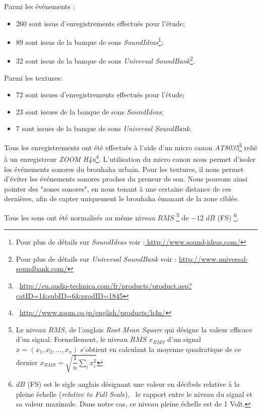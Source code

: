 Parmi les événements :

\begin{itemize}
\item 260 sont issus d’enregistrements effectués pour l'étude;
\item 89 sont issus de la banque de sons \emph{SoundIdeas}\footnote{Pour plus de détails sur \emph{SoundIdeas} voir :\url{ http://www.sound-ideas.com/}};
\item 32 sont issus de la banque de sons \emph{Universal SoundBank}\footnote{Pour plus de détails sur \emph{Universal SoundBank} voir : \url{http://www.universal-soundbank.com/}}.
\end{itemize}

Parmi les textures:

\begin{itemize}
\item 72 sont issues d’enregistrements effectués pour l'étude;
\item 23 sont issues de la banque de sons \emph{SoundIdeas};
\item 7 sont issues de la banque de sons \emph{Universal SoundBank}.
\end{itemize}

Tous les enregistrements ont été effectués à l’aide d'un micro canon \emph{AT8035}\footnote{\cf~\url{http://eu.audio-technica.com/fr/products/product.asp?catID=1&subID=6&prodID=1845}} relié à un enregistreur \emph{ZOOM H4n}\footnote{\cf~\url{http://www.zoom.co.jp/english/products/h4n/}}. L’utilisation du micro canon nous permet d’isoler les événements sonores du brouhaha urbain. Pour les textures, il nous permet d’éviter les événements sonores proches du preneur de son. Nous pouvons ainsi pointer des "zones sonores", en nous tenant à une certaine distance de ces dernières, afin de capter uniquement le brouhaha émanant de la zone ciblée.

Tous les sons ont été normalisés au même niveau $RMS$ \footnote{Le niveau $RMS$, de l'anglais \emph{Root Mean Square} qui désigne la valeur efficace d'un signal. Formellement, le niveau $RMS$ $x_{RMS}$ d'un signal $x=(x_1,x_2,\ldots,x_n)$ s'obtient en calculant la moyenne quadratique de ce dernier $x_{RMS}=\sqrt{\dfrac{1}{n}\sum\limits_{i} x_i^2}$} de $-12$ $dB$ (FS) \footnote{$dB$ (FS) est le sigle anglais désignant une valeur en décibels relative à la pleine échelle (\emph{relative to Full Scale}), \ie~le rapport entre le niveau du signal et sa valeur maximale. Dans notre cas, ce niveau pleine échelle est de 1 Volt.}.

